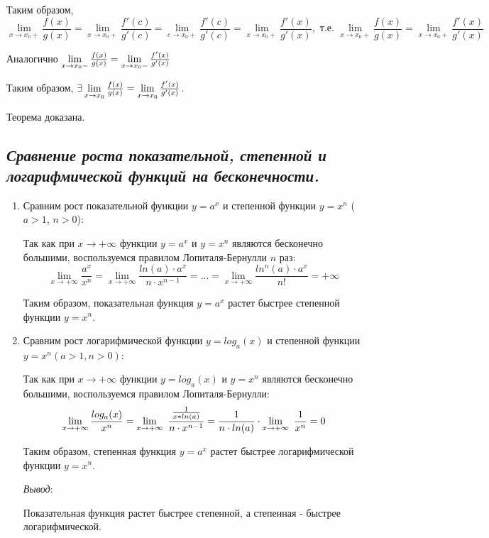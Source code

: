 Таким образом, $$\lim\limits_{x \rightarrow x_0+}{\frac{f(x)}{g(x)}} = \lim\limits_{x \rightarrow x_0+}{\frac{f'(c)}{g'(c)}} = \lim\limits_{c \rightarrow x_0+}{\frac{f'(c)}{g'(c)}} =\lim\limits_{x \rightarrow x_0+}{\frac{f'(x)}{g'(x)}}, \text{ т.е. } \lim\limits_{x \rightarrow x_0+}{\frac{f(x)}{g(x)}}=\lim\limits_{x \rightarrow x_0+}{\frac{f'(x)}{g'(x)}}$$

Аналогично $\lim\limits_{x \rightarrow x_0-}{\Large\frac{f(x)}{g(x)}}=\lim\limits_{x \rightarrow x_0-}{\Large\frac{f'(x)}{g'(x)}}$

Таким образом, $\exists\lim\limits_{x \rightarrow x_0}{\Large\frac{f(x)}{g(x)}}=\lim\limits_{x \rightarrow x_0}{\Large\frac{f'(x)}{g'(x)}}$.

Теорема доказана.
\newpage 
\subsection{\textit{Сравнение роста показательной, степенной и логарифмической функций на бесконечности.}}
\begin{enumerate}

\item Сравним рост показательной функции $y = a^x$ и степенной функции $y = x^n$ ($a > 1$, $n > 0$):

Так как при $x \rightarrow +\infty$ функции $y = a^x$ и $y = x^n$ являются бесконечно большими, воспользуемся правилом Лопиталя-Бернулли $n$ раз: $$\lim\limits_{x \rightarrow +\infty}{\frac{a^x}{x^n}} = \lim\limits_{x \rightarrow +\infty}{\frac{ln(a)\cdot a^x}{n\cdot x^{n - 1}}} =...=\lim\limits_{x \rightarrow +\infty}{\frac{ln^n(a)\cdot a^x}{n!}} = +\infty$$

Таким образом, показательная функция $y = a^x$ растет быстрее степенной функции $y = x^n$.
\item Сравним рост логарифмической функции $y = log_a(x)$ и степенной функции $y = x^n (a > 1, n > 0)$:

Так как при $x \rightarrow +\infty$ функции $y  = log_a(x)$ и $y = x^n$ являются бесконечно большими, воспользуемся правилом Лопиталя-Бернулли: $$\lim\limits_{x \rightarrow +\infty}{\frac{ log_a(x)}{x^n}} 
    = \lim\limits_{x \rightarrow +\infty}{\ \frac{\large\frac{1}{x*ln(a)}}{n\cdot x^{n - 1}}} 
    =\frac{1}{n\cdot ln(a)}\cdot \lim\limits_{x \rightarrow +\infty}{\ \frac{1}{x^{n}}}
    = 0$$

Таким образом, степенная функция $y = a^x$ растет быстрее логарифмической функции $y = x^n$.

\textit{Вывод}:

Показательная функция растет быстрее степенной, а степенная - быстрее логарифмической.

\end{enumerate}
\newpage 
